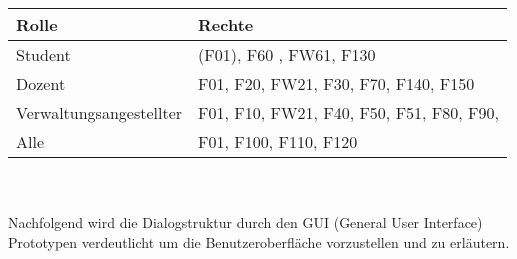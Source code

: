 \begin{table}[h]
\begin{tabular}{l|l}
Rolle&Rechte\\
\hline
\hline
Student & (F01), F60 , FW61, F130 \\
\hline
Dozent & F01, F20, FW21, F30, F70, F140, F150  \\
\hline
Verwaltungsangestellter & F01, F10, FW21, F40, F50, F51, F80, F90,  \\
\hline
Alle & F01, F100, F110, F120
\end{tabular}
\end{table}
\\
\\
Nachfolgend wird die Dialogstruktur durch den GUI (General User Interface) Prototypen verdeutlicht um die Benutzeroberfläche vorzustellen und zu erläutern.\\
